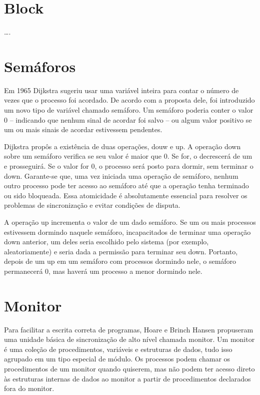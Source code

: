 \section{Block}
….


\section{Semáforos}

Em 1965 Dijkstra sugeriu usar uma variável inteira para contar o número de vezes que o 
processo foi acordado. De acordo com a proposta dele, foi introduzido um novo tipo de 
variável chamado semáforo. Um semáforo poderia conter o valor 0 – indicando que nenhum 
sinal de acordar foi salvo – ou algum valor positivo se um ou mais sinais de acordar 
estivessem pendentes.

Dijkstra propôs a existência de duas operações,  douw e up. A operação down sobre um 
semáforo verifica se seu valor é maior que 0. Se for, o decrescerá de um e prosseguirá. 
Se o valor for 0, o processo será posto para dormir, sem terminar o down. Garante-se que, 
uma vez iniciada uma operação de semáforo, nenhum outro processo pode ter acesso ao 
semáforo até que a operação tenha terminado ou sido bloqueada. Essa atomicidade é 
absolutamente essencial para resolver os problemas de sincronização e evitar condições 
de disputa.

A operação up incrementa o valor de um dado semáforo. Se um ou mais processos estivessem 
dormindo naquele semáforo, incapacitados de terminar uma operação down anterior, um deles 
seria escolhido pelo sistema (por exemplo, aleatoriamente) e seria dada a permissão para 
terminar seu down. Portanto, depois de um up em um semáforo com processos dormindo nele, 
o semáforo permanecerá 0, mas haverá um processo a menor dormindo nele.

\section{Monitor}

Para facilitar a escrita correta de programas, Hoare e Brinch Hansen propuseram uma unidade 
básica de sincronização de alto nível chamada monitor.  Um monitor é uma coleção de procedimentos, 
variáveis e estruturas de dados, tudo isso agrupado em um tipo especial de módulo. Os processos 
podem chamar os procedimentos de um monitor quando quiserem, mas não podem ter acesso direto às 
estruturas internas de dados ao monitor a partir de procedimentos declarados fora do monitor.

